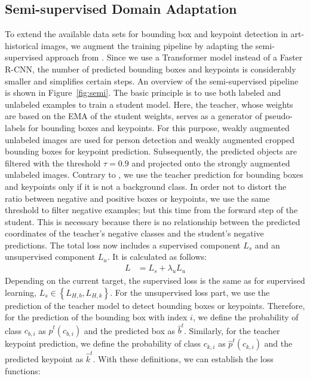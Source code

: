 \documentclass[sigconf]{acmart}
\begin{document}
\subsection{Semi-supervised Domain Adaptation}\label{sec:semi}

To extend the available data sets for bounding box and keypoint detection in art-historical images, we augment the training pipeline by adapting the semi-supervised approach from \citet{DBLP:conf/iccv/Xu00WWWB021}. 
Since we use a Transformer model instead of a Faster R-CNN, the number of predicted bounding boxes and keypoints is considerably smaller and simplifies certain steps. 
An overview of the semi-supervised pipeline is shown in Figure~\ref{fig:semi}. 
The basic principle is to use both labeled and unlabeled examples to train a student model. 
Here, the teacher, whose weights are based on the \ac{EMA} of the student weights, serves as a generator of pseudo-labels for bounding boxes and keypoints. 
For this purpose, weakly augmented unlabeled images are used for person detection and weakly augmented cropped bounding boxes for keypoint prediction. 
Subsequently, the predicted objects are filtered with the threshold $\tau=0.9$ and projected onto the strongly augmented unlabeled images. 
Contrary to \citet{DBLP:conf/iccv/Xu00WWWB021}, we use the teacher prediction for bounding boxes and keypoints only if it is not a background class. 
In order not to distort the ratio between negative and positive boxes or keypoints, we use the same threshold to filter negative examples; but this time from the forward step of the student. 
This is necessary because there is no relationship between the predicted coordinates of the teacher's negative classes and the student's negative predictions. 
The total loss now includes a supervised component $L_s$ and an unsupervised component $L_u$. 
It is calculated as follows:
\begin{align}
    L &= L_s + \lambda_{u} L_u
\end{align}
Depending on the current target, the supervised loss is the same as for supervised learning, $L_s \in \left\{L_{H,b},L_{H,k}\right\}$. For the unsupervised loss part, we use the prediction of the teacher model to detect bounding boxes or keypoints. Therefore, for the prediction of the bounding box with index $i$, we define the probability of class $c_{b,i}$ as $\hat{p}^t\left(c_{b,i}\right)$ and the predicted box as $\hat{b}^t$. Similarly, for the teacher keypoint prediction, we define the probability of class $c_{k,i}$ as $\hat{p}^t\left(c_{k,i}\right)$ and the predicted keypoint as $\hat{k}^t$. With these definitions, we can establish the loss functions:
\end{document}
